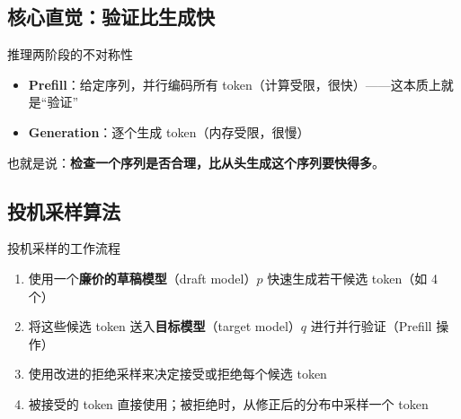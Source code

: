 \documentclass[a4paper]{article}
\begin{document}
\subsection{核心直觉：验证比生成快}

\begin{importantbox}{推理两阶段的不对称性}
\begin{itemize}
    \item \textbf{Prefill}：给定序列，并行编码所有 token（计算受限，很快）——这本质上就是``验证''
    \item \textbf{Generation}：逐个生成 token（内存受限，很慢）
\end{itemize}
也就是说：\textbf{检查一个序列是否合理，比从头生成这个序列要快得多}。
\end{importantbox}

\subsection{投机采样算法}

\begin{importantbox}{投机采样的工作流程}
\begin{enumerate}
    \item 使用一个\textbf{廉价的草稿模型}（draft model）$p$ 快速生成若干候选 token（如 4 个）
    \item 将这些候选 token 送入\textbf{目标模型}（target model）$q$ 进行并行验证（Prefill 操作）
    \item 使用改进的拒绝采样来决定接受或拒绝每个候选 token
    \item 被接受的 token 直接使用；被拒绝时，从修正后的分布中采样一个 token
\end{enumerate}
\end{importantbox}
\end{document}

